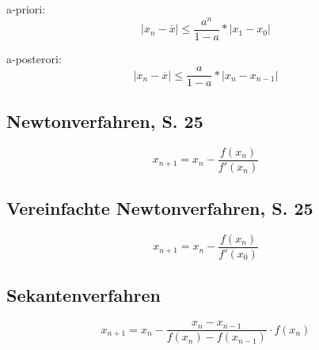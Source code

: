a-priori:
\[|x_n - \overline{x}| \leq{} \frac{a^n}{1 - a} * |x_1 - x_0|\]

a-posterori:
\[|x_n - \overline{x}| \leq{} \frac{a}{1 - a} * |x_n - x_{n-1}|\]

\subsection{Newtonverfahren, S. 25}

\[x_{n+1} = x_n - \frac{f(x_n)}{f'(x_n)}\]

\subsection{Vereinfachte Newtonverfahren, S. 25}

\[x_{n+1} = x_n - \frac{f(x_n)}{f'(x_0)}\]

\subsection{Sekantenverfahren}

\[x_{n+1} = x_n - \frac{x_n-x_{n-1}}{f(x_n) - f(x_{n-1})} \cdot f(x_n)\]


